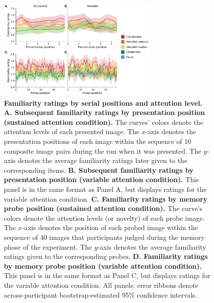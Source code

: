 \documentclass[english]{article}
\begin{document}
\begin{figure}[tp]
	\centering
	\includegraphics[width=0.7\textwidth]{figs/encoding_and_retrieval_timecourses}
  
  \caption{\textbf{Familiarity ratings by serial positions and attention
  level.} \textbf{A. Subsequent familiarity ratings by presentation position
  (sustained attention condition).} The curves' colors denote the attention
  levels of each presented image. The $x$-axis denotes the presentation
  positions of each image within the sequence of 10 composite image pairs
  during the run when it was presented. The $y$-axis denotes the average
  familiarity ratings later given to the corresponding items. \textbf{B.
  Subsequent familiarity ratings by presentation position (variable attention
  condition).} This panel is in the same format as Panel A, but displays
  ratings for the variable attention condition. \textbf{C. Familiarity ratings
  by memory probe position (sustained attention condition).} The curve's colors
  denote the attention levels (or novelty) of each probe image. The $x$-axis
  denotes the position of each probed image within the sequence of 40 images
  that participants judged during the memory phase of the experiment. The
  $y$-axis denotes the average familiarity ratings given to the corresponding
  probes. \textbf{D. Familiarity ratings by memory probe position (variable
  attention condition).} This panel is in the same format as Panel C, but
  displays ratings for the variable attention condition. All panels: error
  ribbons denote across-participant bootstrap-estimated 95\% confidence
  intervals.}
  
  \label{fig:timecourses}
  \end{figure}
\end{document}
